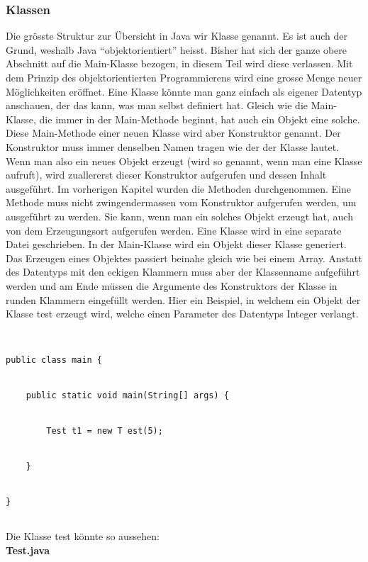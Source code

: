 \subsubsection{Klassen}


Die grösste Struktur zur Übersicht in Java wir Klasse genannt. Es ist auch der Grund, weshalb Java "`objektorientiert"' heisst. Bisher hat sich der ganze obere Abschnitt auf die Main-Klasse bezogen, in diesem Teil wird diese verlassen. Mit dem Prinzip des objektorientierten Programmierens wird eine grosse Menge neuer Möglichkeiten eröffnet. Eine Klasse könnte man ganz einfach als eigener Datentyp anschauen, der das kann, was man selbst definiert hat. Gleich wie die Main-Klasse, die immer in der Main-Methode beginnt, hat auch ein Objekt eine solche. Diese Main-Methode einer neuen Klasse wird aber Konstruktor genannt. Der Konstruktor muss immer denselben Namen tragen wie der der Klasse lautet. Wenn man also ein neues Objekt erzeugt (wird so genannt, wenn man eine Klasse aufruft), wird zuallererst dieser Konstruktor aufgerufen und dessen Inhalt ausgeführt. Im vorherigen Kapitel wurden die Methoden durchgenommen. Eine Methode muss nicht zwingendermassen vom Konstruktor aufgerufen werden, um ausgeführt zu werden. Sie kann, wenn man ein solches Objekt erzeugt hat, auch von dem Erzeugungsort aufgerufen werden. Eine Klasse wird in eine separate Datei geschrieben. In der Main-Klasse wird ein Objekt dieser Klasse generiert. Das Erzeugen eines Objektes passiert beinahe gleich wie bei einem Array. Anstatt des Datentyps mit den eckigen Klammern muss aber der Klassenname aufgeführt werden und am Ende müssen die Argumente des Konstruktors der Klasse in runden Klammern eingefüllt werden. Hier ein Beispiel, in welchem ein Objekt der Klasse test erzeugt wird, welche einen Parameter des Datentyps Integer verlangt.


\begin{lstlisting}


public class main {


	public static void main(String[] args) {


		Test t1 = new T	est(5);


	}


}


\end{lstlisting}


Die Klasse test könnte so aussehen: \\


\textbf{Test.java}


